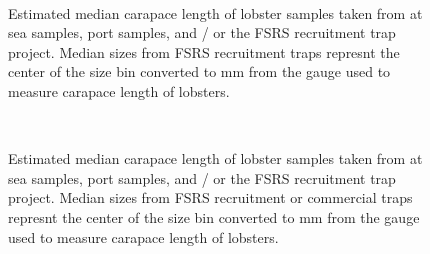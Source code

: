 \documentclass[11pt]{article}
\newcommand{\D}{.}
\newcommand{\e}{/backup/bio_data/bio.lobster/figures/} %
\begin{document}
\begin{landscape}
\begin{figure}
        \centering
         \\
                    
                    \caption{Estimated median carapace length of lobster samples taken from at sea samples, port samples, and / or the FSRS recruitment trap project. Median sizes from FSRS recruitment traps represnt the center of the size bin converted to mm from the gauge used to measure carapace length of lobsters.}
        \end{figure}

\begin{figure}
        \centering
         \\
                    
                    \caption{Estimated median carapace length of lobster samples taken from at sea samples, port samples, and / or the FSRS recruitment trap project. Median sizes from FSRS recruitment or commercial traps represnt the center of the size bin converted to mm from the gauge used to measure carapace length of lobsters. }
        \end{figure}
\end{landscape}
\end{document}
